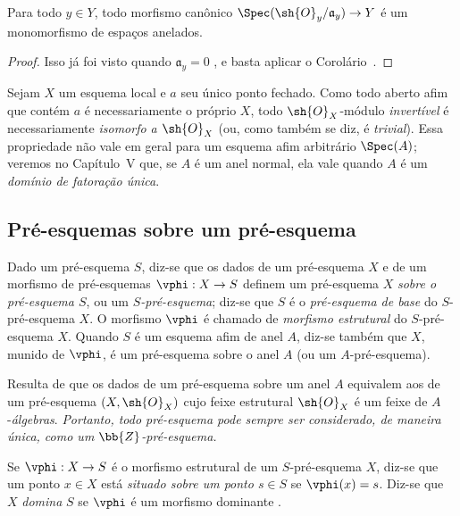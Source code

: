\documentclass[oneside]{amsart}
\makeatletter
\newcommand{\ega@arrow}[2]{\mathchoice{#1}{#2}{#2}{#2}}
\renewcommand{\to}{\ega@arrow{\longrightarrow}{\rightarrow}}
\let\EGAOriginalLabel\label
\renewcommand{\label}[1]{\phantomsection\EGAOriginalLabel{#1}}
\makeatother
\begin{document}
\begin{corollary}[2.4.7]
\label{I.2.4.7}
Para todo $y\in Y$, todo morfismo canônico
$\Spec(\sh{O}_y/\mathfrak{a}_y)\to Y$ é um monomorfismo de espaços
anelados.
\end{corollary}

\begin{proof}
Isso já foi visto quando $\mathfrak{a}_y=0$ , e basta
aplicar o Corolário~.
\end{proof}

\begin{remark}[2.4.8]
\label{I.2.4.8}
Sejam $X$ um esquema local e $a$ seu único ponto fechado.
Como todo aberto afim que contém $a$ é necessariamente o próprio $X$, todo $\sh{O}_X$-módulo \emph{invertível}  é necessariamente \emph{isomorfo a $\sh{O}_X$} (ou, como também se diz, é \emph{trivial}).
Essa propriedade não vale em geral para um esquema afim arbitrário $\Spec(A)$;
veremos no Capítulo~V que, se $A$ é um anel normal, ela vale quando $A$ é um \emph{domínio de fatoração única}.
\end{remark}

\subsection{Pré-esquemas sobre um pré-esquema}
\label{subsection:I.2.5}

\begin{definition}[2.5.1]
\label{I.2.5.1}
Dado um pré-esquema $S$, diz-se que os dados de um pré-esquema $X$ e de um morfismo de pré-esquemas $\vphi:X\to S$ definem um pré-esquema $X$ \emph{sobre o pré-esquema $S$}, ou um \emph{$S$-pré-esquema}; diz-se que $S$ é o \emph{pré-esquema de base} do $S$-pré-esquema $X$.
O morfismo $\vphi$ é chamado de \emph{morfismo estrutural} do $S$-pré-esquema $X$.
Quando $S$ é um esquema afim de anel $A$, diz-se também que $X$, munido de $\vphi$, é um pré-esquema sobre o anel $A$ (ou um $A$-pré-esquema).
\end{definition}

Resulta de  que os dados de um pré-esquema sobre um anel $A$ equivalem aos de um pré-esquema $(X,\sh{O}_X)$ cujo feixe estrutural $\sh{O}_X$ é um feixe de $A$-\emph{álgebras}.
\emph{Portanto, todo pré-esquema pode sempre ser considerado, de maneira única, como um $\bb{Z}$-pré-esquema.}

Se $\vphi:X\to S$ é o morfismo estrutural de um $S$-pré-esquema $X$, diz-se que um ponto $x\in X$ está \emph{situado sobre um ponto $s\in S$} se $\vphi(x)=s$.
Diz-se que $X$ \emph{domina} $S$ se $\vphi$ é um morfismo dominante .
\end{document}
